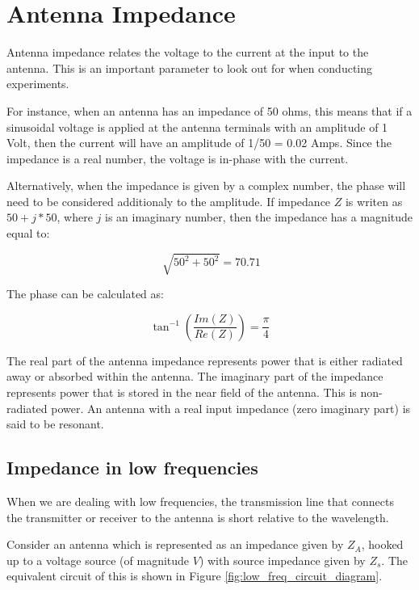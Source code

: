 \documentclass[a4paper,12pt]{report}
\begin{document}
\section{Antenna Impedance}


Antenna impedance relates the voltage to the current at the input to the antenna.
This is an important parameter to look out for when conducting experiments.

For instance, when an antenna has an impedance of 50 ohms,
this means that if a sinusoidal voltage is applied at the antenna terminals with an amplitude of 1 Volt,
then the current will have an amplitude of 1/50 = 0.02 Amps.
Since the impedance is a real number, the voltage is in-phase with the current.

Alternatively, when the impedance is given by a complex number,
the phase will need to be considered additionaly to the amplitude.
If impedance $Z$ is writen as $50 + j*50$, where $j$ is an imaginary number,
then the impedance has a magnitude equal to:

\begin{equation}
  \sqrt[]{50^2 + 50 ^2} = 70.71
\end{equation}

The phase can be calculated as:

\begin{equation}
  \tan^{-1}(\frac{Im(Z)}{Re(Z)}) = \frac{\pi}{4}
\end{equation}

The real part of the antenna impedance represents power that is either radiated away or absorbed within the antenna.
The imaginary part of the impedance represents power
that is stored in the near field of the antenna.
This is non-radiated power.
An antenna with a real input impedance (zero imaginary part)
is said to be resonant.

\subsection{Impedance in low frequencies}

When we are dealing with low frequencies,
the transmission line that connects the transmitter or receiver
to the antenna is short relative to the wavelength.

Consider an antenna which is represented as an impedance given by $Z_A$,
hooked up to a voltage source (of magnitude $V$) with source impedance given by $Z_s$.
The equivalent circuit of this is shown in
Figure \ref{fig:low_freq_circuit_diagram}.
\end{document}
